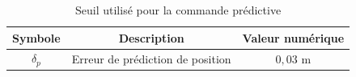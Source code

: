 \vspace{0.5em}
\begin{table}[h!]
    \centering
    \begin{tabular}{|c|c|c|}
        \hline
        \textbf{Symbole} & \textbf{Description} & \textbf{Valeur numérique} \\
        \hline
        $\delta_p$ & Erreur de prédiction de position & $0{,}03$ m \\
        \hline
    \end{tabular}
    \caption{Seuil utilisé pour la commande prédictive}
\end{table}